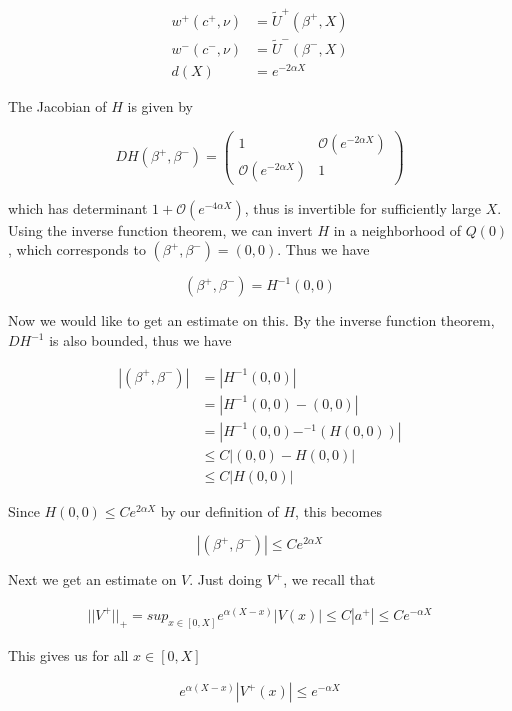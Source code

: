 \documentclass[12pt]{article}
\begin{document}
\begin{align*}
w^+(c^+, \nu) &= \tilde{U}^+(\beta^+, X) \\
w^-(c^-, \nu) &= \tilde{U}^-(\beta^-, X) \\
d(X) &= e^{-2 \alpha X}
\end{align*}

The Jacobian of $H$ is given by 

\begin{equation}
D H(\beta^+, \beta^-) = 
\begin{pmatrix}
1 & \mathcal{O}(e^{-2 \alpha X}) \\
\mathcal{O}(e^{-2 \alpha X}) &  1 
\end{pmatrix}
\end{equation}

which has determinant $1 + \mathcal{O}(e^{-4 \alpha X})$, thus is invertible for sufficiently large $X$. Using the inverse function theorem, we can invert $H$ in a neighborhood of $Q(0)$, which corresponds to $(\beta^+, \beta^-) = (0, 0)$. Thus we have 

\[
(\beta^+, \beta^-) = H^{-1}(0, 0)
\]

Now we would like to get an estimate on this. By the inverse function theorem, $D H^{-1}$ is also bounded, thus we have 

\begin{align*}
| (\beta^+, \beta^-) | &= | H^{-1}(0, 0) | \\
&= | H^{-1}(0, 0) - (0, 0) | \\
&= | H^{-1}(0, 0) - ^{-1}(H(0, 0)) | \\
& \leq C | (0, 0) - H(0, 0) | \\
& \leq C |H(0, 0)|

\end{align*}

Since $H(0, 0) \leq C e^{2 \alpha X}$ by our definition of $H$, this becomes

\[
| (\beta^+, \beta^-) | \leq C e^{2 \alpha X}
\]

Next we get an estimate on $V$. Just doing $V^+$, we recall that

\begin{align*}
||V^+||_+ = sup_{x \in [0, X]} e^{\alpha(X - x)}|V(x)| \leq C |a^+| \leq C e^{-\alpha X}
\end{align*}

This gives us for all $x \in [0, X]$

\begin{align*}
e^{\alpha(X - x)}|V^+(x)| \leq e^{-\alpha X} 
\end{align*}
\end{document}
